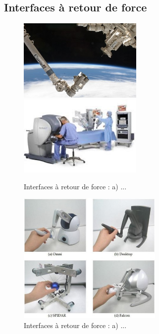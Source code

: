 \subsection{Interfaces à retour de force}
\begin{figure}[!h]
	\centering
	\includegraphics[width=6cm]{Photos/bras_ca.jpg}\hspace{2cm}
	\includegraphics[width=6cm]{Photos/da_vinci.jpg}
	\caption{Interfaces à retour de force : a) ... }\label{int_retourf_1}
\end{figure}
\begin{figure}[!h]
	\centering
	\includegraphics[width=7cm]{Photos/falcon.jpg}
	\caption{Interfaces à retour de force : a) ... }\label{int_retourf_2}
\end{figure}	
